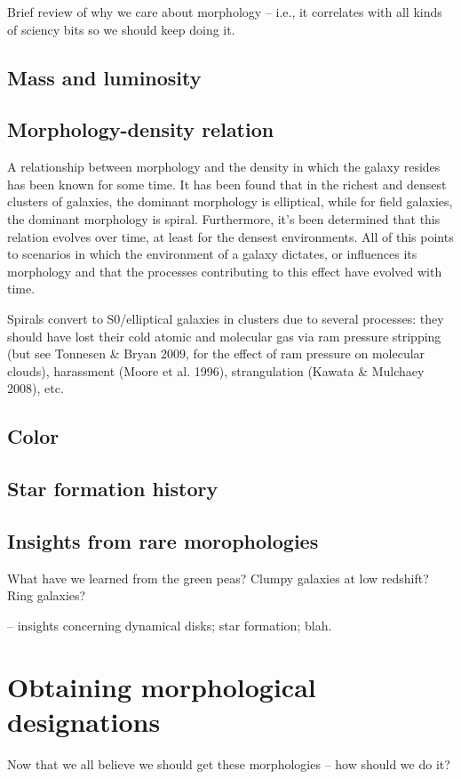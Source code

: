 Brief review of why we care about morphology -- i.e., it correlates with all kinds of sciency bits so we should keep doing it. 

\subsection{Mass and luminosity}

\subsection{Morphology-density relation}
A relationship between morphology and the density in which the galaxy resides has been known for some time. It has been found that in the richest and densest clusters of galaxies, the dominant morphology is elliptical, while for field galaxies, the dominant morphology is spiral. Furthermore, it's been determined that this relation evolves over time, at least for the densest environments. All of this points to scenarios in which the environment of a galaxy dictates, or influences its morphology and that the processes contributing to this effect have evolved with time. \citep[e.g.,][]{Fasano2000, Shen2003, Smith2005, Peng2010}

Spirals convert to S0/elliptical galaxies in clusters due to several processes: they should have lost their cold atomic and molecular gas via ram pressure stripping (but see Tonnesen & Bryan 2009, for the effect of ram
pressure on molecular clouds), harassment (Moore et al. 1996),
strangulation (Kawata & Mulchaey 2008), etc.


\subsection{Color}

\subsection{Star formation history}

\subsection{Insights from rare morophologies}
What have we learned from the green peas? Clumpy galaxies at low redshift? Ring galaxies? 

-- insights concerning dynamical disks; star formation; blah. 


\section{Obtaining morphological designations}
Now that we all believe we should get these morphologies -- how should we do it? 

